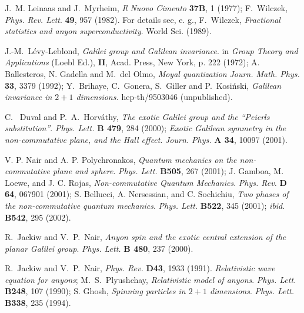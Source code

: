 \documentclass[a4paper,11pt]{article}
\begin{document}
\begin{thebibliography}{99}
J.~M. Leinaas and J.~Myrheim,
{\sl Il Nuovo Cimento} {\bf 37B}, 1 (1977);
F.~Wilczek, {\sl Phys. Rev. Lett}. {\bf  49}, 957 (1982).
For details
see, e. g., F.~Wilczek,
{\it Fractional statistics and anyon superconductivity}.
World Sci. (1989).

J.-M.~L\'evy-Leblond,
{\it Galilei group and Galilean invariance}.
in {\it Group Theory and Applications} (Loebl Ed.),
{\bf II}, Acad. Press, New York, p. 222 (1972);
A. Ballesteros, N. Gadella and M.~del Olmo,
{\it Moyal quantization}
{\sl Journ. Math. Phys.} {\bf 33}, 3379 (1992);
Y.~Brihaye, C.~Gonera, S.~Giller and P.~Kosi\'nski,
{\it Galilean invariance in $2+1$ dimensions.}
hep-th/9503046 (unpublished).

C.~ Duval and P.~A.~Horv\'athy,
   {\it The exotic Galilei group and the ``Peierls substitution''}.
{\sl Phys. Lett.} {\bf B 479}, 284 (2000); %
{\it Exotic Galilean symmetry in the non-commutative plane,
and the Hall  effect}.
{\sl Journ. Phys.} {\bf A 34}, 10097 (2001).


V. P. Nair and A. P. Polychronakos,
{\it Quantum mechanics on the non-commutative plane and sphere}.
{\sl Phys. Lett.} {\bf B505}, 267 (2001);
J. Gamboa, M. Loewe, and J. C. Rojas,
{\it Non-commutative Quantum Mechanics}. {\sl Phys. Rev.} {\bf D 64},
067901 (2001);
S. Bellucci, A. Nersessian, and C. Sochichiu,
{\it Two phases of the non-commutative quantum mechanics}.
{\sl Phys. Lett.} {\bf B522}, 345 (2001);
{\it ibid}. {\bf B542}, 295 (2002).

R.~Jackiw and V.~P.~Nair,
{\it Anyon spin and the exotic central extension of the
  planar Galilei group}. %
{\sl Phys. Lett.} {\bf B 480}, 237 (2000).

R.~Jackiw and V.~P.~Nair,
{\sl Phys. Rev.} {\bf D43}, 1933 (1991).
{\it Relativistic wave equation for anyons};
M.~S.~Plyushchay,
{\it Relativistic model of anyons}.
{\sl Phys. Lett.} {\bf B248}, 107 (1990);
S. Ghosh, {\it Spinning particles in $2+1$ dimensions}.
{\sl Phys. Lett.} {\bf B338}, 235 (1994).


\end{thebibliography}
\end{document}
